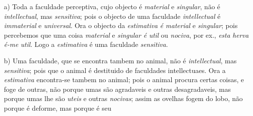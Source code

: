 
 

a) Toda a faculdade perceptiva, cujo objecto é \emph{material} e \emph{singular}, não é \emph{intellectual}, mas \emph{sensitiva}; pois o objecto de uma faculdade \emph{intellectual} é \emph{immaterial} e \emph{universal}. Ora o objecto da \emph{estimativa é material} e \emph{singular}; pois percebemos que uma coisa \emph{material} e \emph{singular é util} ou \emph{nociva}, por ex., \emph{esta herva é-me util}. Logo a \emph{estimativa} é uma faculdade \emph{sensitiva}.

b) Uma faculdade, que se encontra tambem no animal, não é \emph{intellectual}, mas \emph{sensitiva}; pois que o animal é destituido de faculdades intellectuaes. Ora a \emph{estimativa} encontra-se tambem no animal; pois o animal procura certas coisas, e foge de outras, não porque umas são agradaveis e outras desagradaveis, mas porque umas lhe são \emph{uteis} e outras \emph{nocivas}; assim as ovelhas fogem do lobo, não porque é deforme, mas porque é seu

